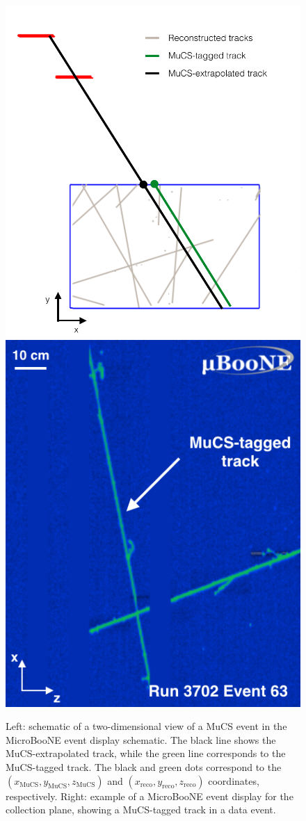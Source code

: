 \documentclass[a4paper,11pt]{article}
\begin{document}
\begin{figure}[htbp]
  \begin{center}
  \includegraphics[width=0.50\linewidth]{figures/evd.pdf}
  \includegraphics[width=0.40\linewidth]{figures/evd_display.png}

  \caption{Left: schematic of a two-dimensional view of a MuCS event in the MicroBooNE event display schematic. The black line shows the MuCS-extrapolated track, while the green line corresponds to the MuCS-tagged track. The black and green dots correspond to the $(x_{\mathrm{MuCS}},y_{\mathrm{MuCS}},z_{\mathrm{MuCS}})$ and $(x_{\mathrm{reco}},y_{\mathrm{reco}},z_{\mathrm{reco}})$ coordinates, respectively. Right: example of a MicroBooNE event display for the collection plane, showing a MuCS-tagged track in a data event.} \label{fig:evd}
\end{center}
\end{figure}
\end{document}
